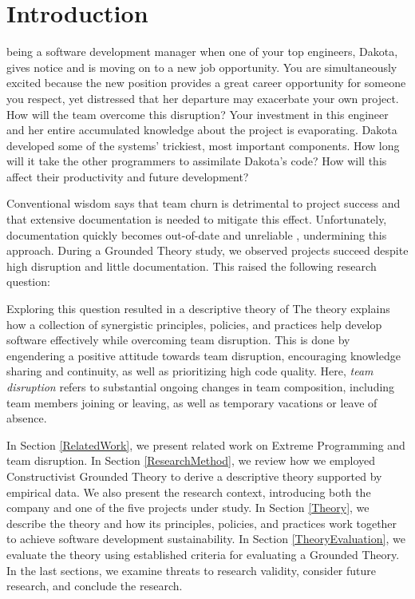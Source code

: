 \section{Introduction}
 being a software development manager when one of your top engineers, Dakota, gives notice and is moving on to a new job opportunity. You are simultaneously excited because the new position provides a great career opportunity for someone you respect, yet distressed that her departure may exacerbate your own project. How will the team overcome this disruption? Your investment in this engineer and her entire accumulated knowledge about the project is evaporating. Dakota developed some of the systems' trickiest, most important components. How long will it take the other programmers to assimilate Dakota's code?  How will this affect their productivity and future development?


Conventional wisdom says that team churn is detrimental to project success and that extensive documentation is needed to mitigate this effect. Unfortunately, documentation quickly becomes out-of-date and unreliable \cite{Lethbridge2003Documentation}, undermining this approach. During a Grounded Theory study, we observed projects succeed despite high disruption and little documentation. This raised the following research question: 

Exploring this question resulted in a descriptive theory of  The theory explains how a collection of synergistic principles, policies, and practices help develop software effectively while overcoming team disruption. This is done by engendering a positive attitude towards team disruption, encouraging knowledge sharing and continuity, as well as prioritizing high code quality. Here, \textit{team disruption} refers to substantial ongoing changes in team composition, including team members joining or leaving, as well as temporary vacations or leave of absence. 

In Section \ref{RelatedWork}, we present related work on Extreme Programming and team disruption. In Section \ref{ResearchMethod}, we review how we employed Constructivist Grounded Theory to derive a descriptive theory supported by empirical data. We also present the research context, introducing both the company and one of the five projects under study. In Section \ref{Theory}, we describe the theory and how its principles, policies, and practices work together to achieve software development sustainability. In Section \ref{TheoryEvaluation}, we evaluate the theory using established criteria for evaluating a Grounded Theory. In the last sections, we examine threats to research validity, consider future research, and conclude the research.
